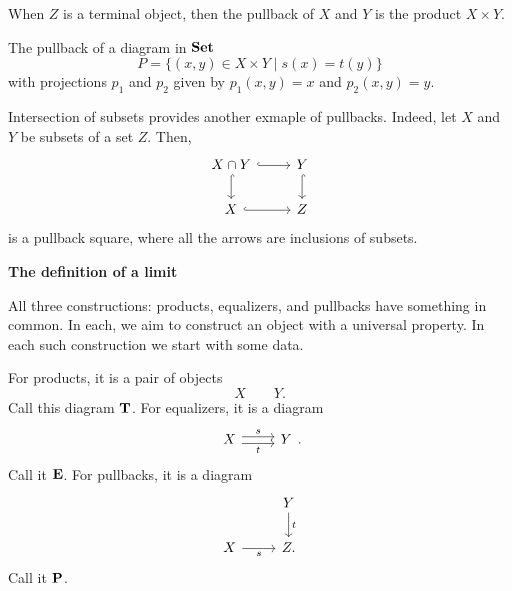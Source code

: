 \begin{remark}
    When $Z$ is a terminal object, then the pullback of $X$ and $Y$ is the product $X\times Y$.
\end{remark}

\begin{example}
    The pullback of a diagram in $\mathbf{Set}$
    \begin{equation*}
        P = \{ (x,y) \in X\times Y\mid s(x)=t(y) \}
    \end{equation*}
    with projections $p_1$ and $p_2$ given by $p_1(x,y)=x$ and $p_2(x,y)=y$.
\end{example}

\begin{example}
    Intersection of subsets provides another exmaple of pullbacks. Indeed, let $X$ and $Y$ be subsets of a set $Z$. Then,
    \begin{equation*}
        \begin{tikzcd}
            X\cap Y \arrow[r, hook, ""] \arrow[d, hook, ""'] & Y \arrow[d, hook, ""] \\
            X \arrow[r, hook, ""'] & Z
        \end{tikzcd}
    \end{equation*}
    is a pullback square, where all the arrows are inclusions of subsets.
\end{example}

\begin{center}
    \textbf{The definition of a limit}
\end{center}
All three constructions: products, equalizers, and pullbacks have something in common. In each, we aim to construct an object with a universal property. In each such construction we start with some data.\par

For products, it is a pair of objects
\begin{equation*}
    X \qquad Y.
\end{equation*}
Call this diagram $\mathbf{T}$. For equalizers, it is a diagram
\begin{equation*}
    \begin{tikzcd}
        X \arrow[r, shift left, "s"] \arrow[r, shift right, "t"'] & Y
    \end{tikzcd}.
\end{equation*}
Call it $\mathbf{E}$. For pullbacks, it is a diagram
\begin{equation*}
\begin{tikzcd}
    & Y \arrow[d, "t"] \\
    X \arrow[r, "s"'] & Z.
\end{tikzcd}
\end{equation*}
Call it $\mathbf{P}$.\par

